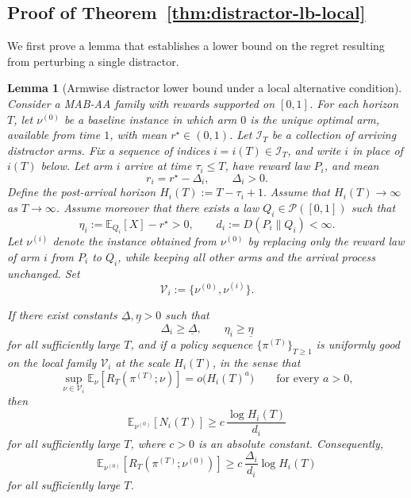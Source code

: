 \documentclass[11pt]{article}
\newtheorem{lemma}{Lemma}
\begin{document}
\subsection{Proof of Theorem~\ref{thm:distractor-lb-local}}
\label{sec:Proof of thm:distractor-lb-local}
We first prove a lemma that establishes a lower bound on the regret resulting from perturbing a single distractor.
\begin{lemma}[Armwise distractor lower bound under a local alternative condition]
\label{lem:distractor-lb-armwise-local}
Consider a MAB-AA family with rewards supported on $[0,1]$. For each horizon
$T$, let $\nu^{(0)}$ be a baseline instance in which arm $0$ is the unique
optimal arm, available from time $1$, with mean $r^\star\in(0,1)$. Let
$\mathcal I_T$ be a collection of arriving distractor arms. Fix a sequence of
indices $i=i(T)\in\mathcal I_T$, and write $i$ in place of $i(T)$ below. Let arm $i$ arrive at time $\tau_i\le T$, have reward law $P_i$, and mean
\[
r_i=r^\star-\Delta_i,
\qquad
\Delta_i>0.
\]
Define the post-arrival horizon \(H_i(T):=T-\tau_i+1.\) Assume that $H_i(T)\to\infty$ as $T\to\infty$. Assume moreover that there exists a law $Q_i\in\mathcal P([0,1])$ such that
\[
\eta_i:=\mathbb E_{Q_i}[X]-r^\star>0,
\qquad
d_i:=D(P_i\|Q_i)<\infty.
\]
Let $\nu^{(i)}$ denote the instance obtained from $\nu^{(0)}$ by replacing only
the reward law of arm $i$ from $P_i$ to $Q_i$, while keeping all other arms and
the arrival process unchanged. Set
\[
\mathcal V_i:=\{\nu^{(0)},\nu^{(i)}\}.
\]

If there exist constants $\underline\Delta,\underline\eta>0$ such that
\[
\Delta_i\ge \underline\Delta,
\qquad
\eta_i\ge \underline\eta
\]
for all sufficiently large $T$, and if a policy sequence
$\{\pi^{(T)}\}_{T\ge1}$ is uniformly good on the local family $\mathcal V_i$ at
the scale $H_i(T)$, in the sense that
\[
\sup_{\nu\in\mathcal V_i}\mathbb E_\nu[R_T(\pi^{(T)};\nu)]
=
o\bigl(H_i(T)^a\bigr)
\qquad
\text{for every }a>0,
\]
then
\[
\mathbb E_{\nu^{(0)}}[N_i(T)]
\ge
c\,\frac{\log H_i(T)}{d_i}
\]
for all sufficiently large $T$, where $c>0$ is an absolute constant.
Consequently,
\[
\mathbb E_{\nu^{(0)}}[R_T(\pi^{(T)};\nu^{(0)})]
\ge
c\,\frac{\Delta_i}{d_i}\log H_i(T)
\]
for all sufficiently large $T$.
\end{lemma}
\end{document}
